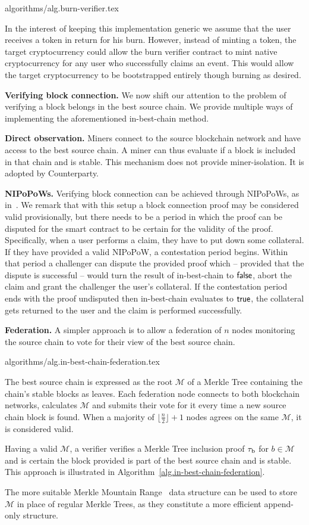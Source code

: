 {algorithms/alg.burn-verifier.tex}

In the interest of keeping this implementation generic we assume that the user receives a token in return for his burn. However, instead of minting a token, the target cryptocurrency could allow the burn verifier contract to mint native cryptocurrency for any user who successfully claims an event. This would allow the target cryptocurrency to be bootstrapped entirely though burning as desired.

\noindent
\textbf{Verifying block connection.}
We now shift our attention to the problem of verifying a block belongs in the best source chain. We provide multiple ways of implementing the aforementioned \textsf{in-best-chain} method.

\noindent
\textbf{Direct observation.}
Miners connect to the source blockchain network and have access to the best source chain. A miner can thus evaluate if a block is included in that chain and is stable. This mechanism does not provide miner-isolation. It is adopted by Counterparty.

\noindent
\textbf{NIPoPoWs.}
Verifying block connection can be achieved through NIPoPoWs, as in~\cite{pow-sidechains}.
We remark that with this setup a block connection proof may be considered valid provisionally, but there needs to be a period in which the proof can be disputed for the smart contract to be certain for the validity of the proof. Specifically, when a user performs a claim, they have to put down some collateral. If they have provided a valid NIPoPoW, a contestation period begins. Within that period a challenger can dispute the provided proof which -- provided that the dispute is successful -- would turn the result of \textsf{in-best-chain} to $\mathsf{false}$, abort the claim and grant the challenger the user's collateral. If the contestation period ends with the proof undisputed then \textsf{in-best-chain} evaluates to $\mathsf{true}$, the collateral gets returned to the user and the claim is performed successfully.

\noindent
\textbf{Federation.}
A simpler approach is to allow a federation of $n$ nodes monitoring the source chain to vote for their view of the best source chain.

{algorithms/alg.in-best-chain-federation.tex}

The best source chain is expressed as the root $\mathcal{M}$ of a Merkle Tree containing the chain's stable blocks as leaves. Each federation node connects to both blockchain networks, calculates $\mathcal{M}$ and submits their vote for it every time a new source chain block is found. When a majority of $\lfloor\frac{n}{2}\rfloor + 1$ nodes agrees on the same $\mathcal{M}$, it is considered valid.

Having a valid $\mathcal{M}$, a verifier verifies a Merkle Tree inclusion proof $\tau_\text{b}$ for $b \in \mathcal{M}$ and is certain the block provided is part of the best source chain and is stable. This approach is illustrated in Algorithm~\ref{alg.in-best-chain-federation}.

The more suitable Merkle Mountain Range~\cite{flyclient} data structure can be used to store $\mathcal{M}$ in place of regular Merkle Trees, as they constitute a more efficient append-only structure.
